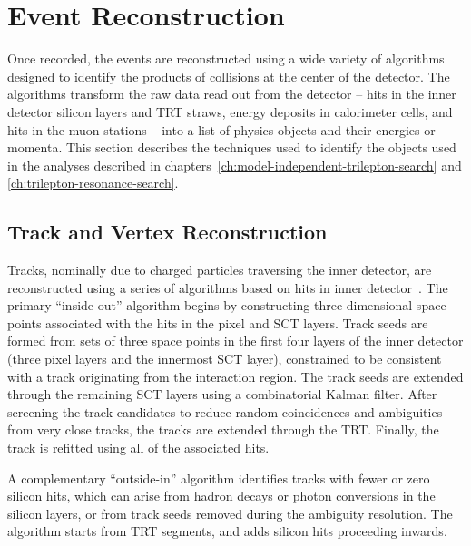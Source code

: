 \chapter{Event Reconstruction}\label{ch:event-reconstruction}

Once recorded, the events are reconstructed using a wide variety of algorithms designed to identify the products of collisions at the center of the detector. The algorithms transform the raw data read out from the detector -- hits in the inner detector silicon layers and TRT straws, energy deposits in calorimeter cells, and hits in the muon stations -- into a list of physics objects and their energies or momenta. This section describes the techniques used to identify the objects used in the analyses described in chapters~\ref{ch:model-independent-trilepton-search} and \ref{ch:trilepton-resonance-search}. 

\section{Track and Vertex Reconstruction}\label{sec:event-reconstruciton-track-vertex}
Tracks, nominally due to charged particles traversing the inner detector, are reconstructed using a series of algorithms based on hits in inner detector~\cite{Cornelissen:2007vba,TheATLASCollaboration:2010vw,TheATLASCollaboration:2012tja}.
The primary ``inside-out'' algorithm begins by constructing three-dimensional space points associated with the hits in the pixel and SCT layers. Track seeds are formed from sets of three space points in the first four layers of the inner detector (three pixel layers and the innermost SCT layer), constrained to be consistent with a track originating from the interaction region. The track seeds are extended through the remaining SCT layers using a combinatorial Kalman filter. After screening the track candidates to reduce random coincidences and ambiguities from very close tracks, the tracks are extended through the TRT. Finally, the track is refitted using all of the associated hits. 

A complementary ``outside-in'' algorithm identifies tracks with fewer or zero silicon hits, which can arise from hadron decays or photon conversions in the silicon layers, or from track seeds removed during the ambiguity resolution. The algorithm starts from TRT segments, and adds silicon hits proceeding inwards. 

